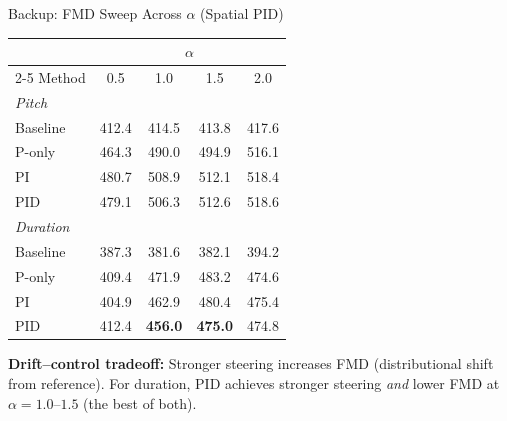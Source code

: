 \documentclass[aspectratio=169, 11pt]{beamer}
\begin{document}
\begin{frame}[noframenumbering]{Backup: FMD Sweep Across $\alpha$ (Spatial PID)}

\begin{table}
\centering\small
\begin{tabular}{lcccc}
  \toprule
  & \multicolumn{4}{c}{$\alpha$} \\
  \cmidrule(lr){2-5}
  Method & 0.5 & 1.0 & 1.5 & 2.0 \\
  \midrule
  \multicolumn{5}{l}{\textit{Pitch}} \\
  Baseline & 412.4 & 414.5 & 413.8 & 417.6 \\
  P-only & 464.3 & 490.0 & 494.9 & 516.1 \\
  PI & 480.7 & 508.9 & 512.1 & 518.4 \\
  PID & 479.1 & 506.3 & 512.6 & 518.6 \\
  \midrule
  \multicolumn{5}{l}{\textit{Duration}} \\
  Baseline & 387.3 & 381.6 & 382.1 & 394.2 \\
  P-only & 409.4 & 471.9 & 483.2 & 474.6 \\
  PI & 404.9 & 462.9 & 480.4 & 475.4 \\
  PID & 412.4 & \textbf{456.0} & \textbf{475.0} & 474.8 \\
  \bottomrule
\end{tabular}
\end{table}

{\small \textbf{Drift--control tradeoff:} Stronger steering increases FMD (distributional shift from reference). For duration, PID achieves stronger steering \emph{and} lower FMD at $\alpha{=}1.0$--$1.5$ (the best of both).}
\end{frame}
\end{document}
